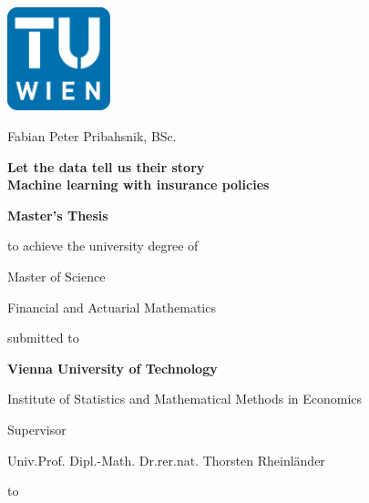 

\begin{titlepage}

{\sffamily

\begin{center}

\includegraphics[width=30mm]{figures/TU_Logo}

\vfill\vfill\vfill
\vfill\vfill\vfill

Fabian Peter Pribahsnik, BSc.

\vfill\vfill\vfill

{\LARGE\bfseries Let the data tell us their story \\ Machine learning with insurance policies}


\vfill\vfill\vfill
\vfill\vfill\vfill


{\bfseries\large Master's Thesis}

to achieve the university degree of

Master of Science

Financial and Actuarial Mathematics


\vfill\vfill\vfill


submitted to

\vfill

{\bfseries\large Vienna University of Technology}

Institute of Statistics and Mathematical Methods in Economics


\vfill\vfill\vfill


Supervisor

Univ.Prof. Dipl.-Math. Dr.rer.nat. Thorsten  Rheinländer

\vfill

\hbox to 

\end{center}
}%
\end{titlepage}

\newpage
